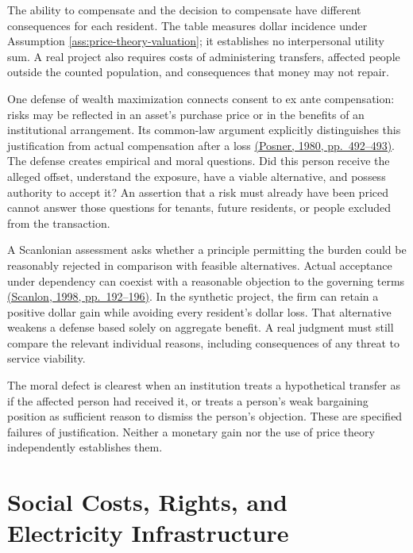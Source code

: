 The ability to compensate and the decision to compensate have different
consequences for each resident. The table measures dollar incidence
under Assumption \ref{ass:price-theory-valuation}; it establishes no
interpersonal utility sum. A real project also requires costs of
administering transfers, affected people outside the counted population,
and consequences that money may not repair.

One defense of wealth maximization connects consent to ex ante
compensation: risks may be reflected in an asset's purchase price or in
the benefits of an institutional arrangement. Its common-law argument
explicitly distinguishes this justification from actual compensation
after a loss
\href{https://laws21.classes.ryansafner.com/readings/Posner-1980a.pdf}{(Posner,
1980, pp.~492--493)}. The defense creates empirical and moral questions.
Did this person receive the alleged offset, understand the exposure,
have a viable alternative, and possess authority to accept it? An
assertion that a risk must already have been priced cannot answer those
questions for tenants, future residents, or people excluded from the
transaction.

A Scanlonian assessment asks whether a principle permitting the burden
could be reasonably rejected in comparison with feasible alternatives.
Actual acceptance under dependency can coexist with a reasonable
objection to the governing terms
\href{https://e-edu.nbu.bg/pluginfile.php/314831/mod_resource/content/0/scanlon_5.1-3.pdf}{(Scanlon,
1998, pp.~192--196)}. In the synthetic project, the firm can retain a
positive dollar gain while avoiding every resident's dollar loss. That
alternative weakens a defense based solely on aggregate benefit. A real
judgment must still compare the relevant individual reasons, including
consequences of any threat to service viability.

The moral defect is clearest when an institution treats a hypothetical
transfer as if the affected person had received it, or treats a person's
weak bargaining position as sufficient reason to dismiss the person's
objection. These are specified failures of justification. Neither a
monetary gain nor the use of price theory independently establishes
them.


\hypertarget{M09-social-costs-rights-and-electricity-infrastructure}{%
\section{Social Costs, Rights, and Electricity
Infrastructure}\label{M09-social-costs-rights-and-electricity-infrastructure}}

